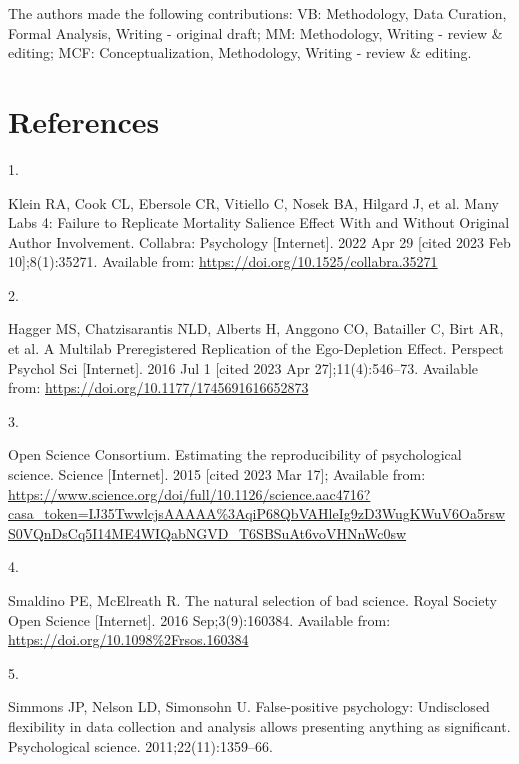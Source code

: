 \documentclass[
  english,
  a4paper,
]{article}
\newlength{\cslhangindent}
\newlength{\csllabelwidth}
\newlength{\cslentryspacingunit} %
\newenvironment{CSLReferences}[2] %
 {%
  \setlength{\parindent}{0pt}
  \ifodd #1
  \let\oldpar\par
  \def\par{\hangindent=\cslhangindent\oldpar}
  \fi
  \setlength{\parskip}{#2\cslentryspacingunit}
 }%
 {}
\newcommand{\CSLLeftMargin}[1]{\parbox[t]{\csllabelwidth}{#1}}
\newcommand{\CSLRightInline}[1]{\parbox[t]{\linewidth - \csllabelwidth}{#1}\break}
\begin{document}
The authors made the following contributions: VB: Methodology, Data Curation, Formal Analysis, Writing - original draft;
MM: Methodology, Writing - review \& editing;
MCF: Conceptualization, Methodology, Writing - review \& editing.

\hypertarget{references}{%
\section*{References}\label{references}}

\hypertarget{refs}{}
\begin{CSLReferences}{0}{0}
\leavevmode{}%
\CSLLeftMargin{1. }%
\CSLRightInline{Klein RA, Cook CL, Ebersole CR, Vitiello C, Nosek BA, Hilgard J, et al. Many {Labs} 4: {Failure} to {Replicate Mortality Salience Effect With} and {Without Original Author Involvement}. Collabra: Psychology {[}Internet{]}. 2022 Apr 29 {[}cited 2023 Feb 10{]};8(1):35271. Available from: \url{https://doi.org/10.1525/collabra.35271}}

\leavevmode{}%
\CSLLeftMargin{2. }%
\CSLRightInline{Hagger MS, Chatzisarantis NLD, Alberts H, Anggono CO, Batailler C, Birt AR, et al. A {Multilab Preregistered Replication} of the {Ego-Depletion Effect}. Perspect Psychol Sci {[}Internet{]}. 2016 Jul 1 {[}cited 2023 Apr 27{]};11(4):546--73. Available from: \url{https://doi.org/10.1177/1745691616652873}}

\leavevmode{}%
\CSLLeftMargin{3. }%
\CSLRightInline{Open Science Consortium. Estimating the reproducibility of psychological science. Science {[}Internet{]}. 2015 {[}cited 2023 Mar 17{]}; Available from: \url{https://www.science.org/doi/full/10.1126/science.aac4716?casa_token=IJ35TwwlcjsAAAAA\%3AqiP68QbVAHleIg9zD3WugKWuV6Oa5rswS0VQnDsCq5I14ME4WIQabNGVD_T6SBSuAt6voVHNnWc0sw}}

\leavevmode{}%
\CSLLeftMargin{4. }%
\CSLRightInline{Smaldino PE, McElreath R. The natural selection of bad science. Royal Society Open Science {[}Internet{]}. 2016 Sep;3(9):160384. Available from: \url{https://doi.org/10.1098\%2Frsos.160384}}

\leavevmode{}%
\CSLLeftMargin{5. }%
\CSLRightInline{Simmons JP, Nelson LD, Simonsohn U. False-positive psychology: Undisclosed flexibility in data collection and analysis allows presenting anything as significant. Psychological science. 2011;22(11):1359--66. }


\end{CSLReferences}
\end{document}
